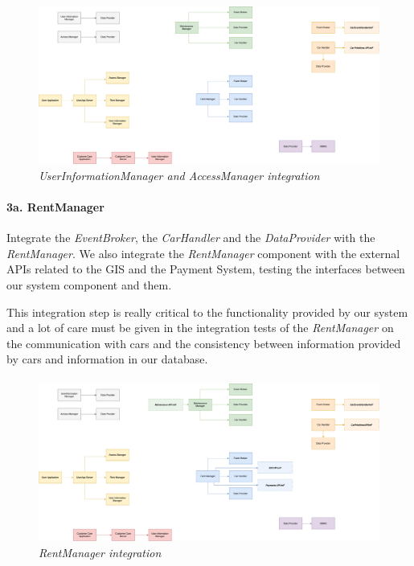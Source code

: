 \paragraph{}
		
		\begin{figure}[h]
			\centering
			\includegraphics[width=0.5\linewidth]{img/Integration2b}
			\caption{
				\label{fig:userInfoAccessManager} 
				\emph{UserInformationManager and AccessManager integration}
			}
		\end{figure}
		
\paragraph{3a. RentManager} 
Integrate the \emph{EventBroker}, the \emph{CarHandler} and the \emph{DataProvider} with the \emph{RentManager}. We also integrate the \emph{RentManager} component with the external APIs related to the GIS and the Payment System, testing the interfaces between our system component and them.

This integration step is really critical to the functionality provided by our system and a lot of care must be given in the integration tests of the \emph{RentManager} on the communication with cars and the consistency between information provided by cars and information in our database.  \\
\paragraph{}
		
		\begin{figure}[h]
			\centering
			\includegraphics[width=0.8\linewidth]{img/Integration3a}
			\caption{
				\label{fig:rentManager} 
				\emph{RentManager integration}
			}
		\end{figure}

